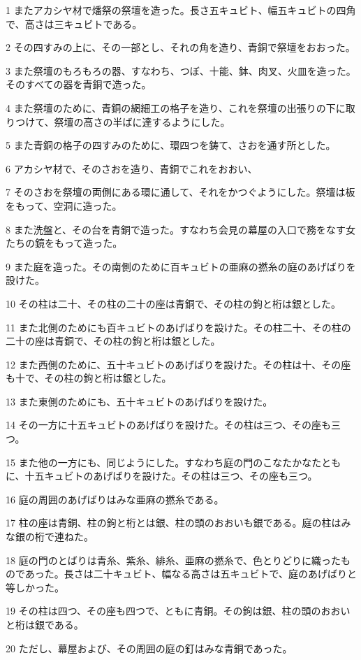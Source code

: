 \par 1 またアカシヤ材で燔祭の祭壇を造った。長さ五キュビト、幅五キュビトの四角で、高さは三キュビトである。
\par 2 その四すみの上に、その一部とし、それの角を造り、青銅で祭壇をおおった。
\par 3 また祭壇のもろもろの器、すなわち、つぼ、十能、鉢、肉叉、火皿を造った。そのすべての器を青銅で造った。
\par 4 また祭壇のために、青銅の網細工の格子を造り、これを祭壇の出張りの下に取りつけて、祭壇の高さの半ばに達するようにした。
\par 5 また青銅の格子の四すみのために、環四つを鋳て、さおを通す所とした。
\par 6 アカシヤ材で、そのさおを造り、青銅でこれをおおい、
\par 7 そのさおを祭壇の両側にある環に通して、それをかつぐようにした。祭壇は板をもって、空洞に造った。
\par 8 また洗盤と、その台を青銅で造った。すなわち会見の幕屋の入口で務をなす女たちの鏡をもって造った。
\par 9 また庭を造った。その南側のために百キュビトの亜麻の撚糸の庭のあげばりを設けた。
\par 10 その柱は二十、その柱の二十の座は青銅で、その柱の鉤と桁は銀とした。
\par 11 また北側のためにも百キュビトのあげばりを設けた。その柱二十、その柱の二十の座は青銅で、その柱の鉤と桁は銀とした。
\par 12 また西側のために、五十キュビトのあげばりを設けた。その柱は十、その座も十で、その柱の鉤と桁は銀とした。
\par 13 また東側のためにも、五十キュビトのあげばりを設けた。
\par 14 その一方に十五キュビトのあげばりを設けた。その柱は三つ、その座も三つ。
\par 15 また他の一方にも、同じようにした。すなわち庭の門のこなたかなたともに、十五キュビトのあげばりを設けた。その柱は三つ、その座も三つ。
\par 16 庭の周囲のあげばりはみな亜麻の撚糸である。
\par 17 柱の座は青銅、柱の鉤と桁とは銀、柱の頭のおおいも銀である。庭の柱はみな銀の桁で連ねた。
\par 18 庭の門のとばりは青糸、紫糸、緋糸、亜麻の撚糸で、色とりどりに織ったものであった。長さは二十キュビト、幅なる高さは五キュビトで、庭のあげばりと等しかった。
\par 19 その柱は四つ、その座も四つで、ともに青銅。その鉤は銀、柱の頭のおおいと桁は銀である。
\par 20 ただし、幕屋および、その周囲の庭の釘はみな青銅であった。
